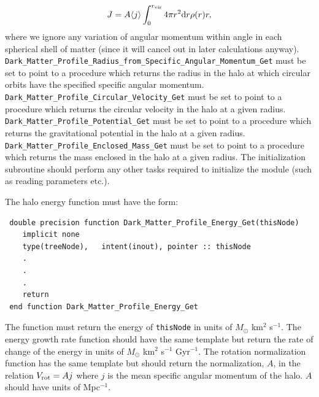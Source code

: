 \begin{equation}
 J = A \langle j \rangle \int_0^{r_{\rm vir}} 4 \pi r^2 \d r \rho(r) r,
\end{equation}
where we ignore any variation of angular momentum within angle in each spherical shell of matter (since it will cancel out in later calculations anyway). {\tt Dark\_Matter\_Profile\_Radius\_from\_Specific\_Angular\_Momentum\_Get} must be set to point to a procedure which returns the radius in the halo at which circular orbits have the specified specific angular momentum. {\tt Dark\_Matter\_Profile\_Circular\_Velocity\_Get} must be set to point to a procedure which returns the circular velocity in the halo at a given radius.  {\tt Dark\_Matter\_Profile\_Potential\_Get} must be set to point to a procedure which returns the gravitational potential in the halo at a given radius.  {\tt Dark\_Matter\_Profile\_Enclosed\_Mass\_Get} must be set to point to a procedure which returns the mass enclosed in the halo at a given radius. The initialization subroutine should perform any other tasks required to initialize the module (such as reading parameters etc.).

The halo energy function must have the form:
\begin{verbatim}
 double precision function Dark_Matter_Profile_Energy_Get(thisNode)
    implicit none
    type(treeNode),   intent(inout), pointer :: thisNode
    .
    .
    .
    return
 end function Dark_Matter_Profile_Energy_Get
\end{verbatim}
The function must return the energy of {\tt thisNode} in units of $M_\odot$ km$^2$ s$^{-1}$. The energy growth rate function should have the same template but return the rate of change of the energy in units of $M_\odot$ km$^2$ s$^{-1}$ Gyr$^{-1}$. The rotation normalization function has the same template but should return the normalization, $A$, in the relation $V_{\rm rot} = A j$ where $j$ is the mean specific angular momentum of the halo. $A$ should have units of Mpc$^{-1}$.

